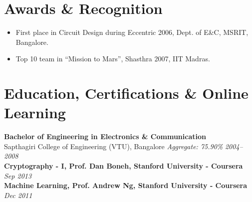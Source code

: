 \documentclass[11pt]{article}
\begin{document}
\section*{Awards \& Recognition}
\begin{itemize}[leftmargin=*, itemsep=0em]
  \item First place in Circuit Design during Eccentric 2006, Dept. of E\&C, MSRIT, Bangalore.
  \item Top 10 team in “Mission to Mars”, Shasthra 2007, IIT Madras.
\end{itemize}


\section*{Education, Certifications \& Online Learning}

\textbf{Bachelor of Engineering in Electronics \& Communication} \\
Sapthagiri College of Engineering (VTU), Bangalore \hfill \textit{Aggregate: 75.90\%} \textit{2004–2008}  \\

\vspace{0.5em}
\textbf{Cryptography - I, Prof. Dan Boneh, Stanford University - Coursera} \hfill \textit{Sep 2013} \\

\textbf{Machine Learning, Prof. Andrew Ng, Stanford University - Coursera} \hfill \textit{Dec 2011} \\
\end{document}
